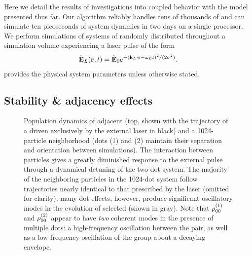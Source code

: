 Here we detail the results of investigations into coupled \qd{} behavior with the model presented thus far.
Our algorithm reliably handles tens of thousands of \qds{} and can simulate ten picoseconds of system dynamics in two days on a single processor.
We perform simulations of systems of \qds{} randomly distributed throughout a simulation volume experiencing a laser pulse of the form
\begin{equation}
  \tilde{\mathbf{E}}_L(\vb{r}, t) = \tilde{\mathbf{E}}_0 e^{-(\vb{k}_L \cdot \vb{r} - \omega_L t)^2/(2\sigma^2)}.
  \label{eq:pulse envelope}
\end{equation}
 provides the physical system parameters unless otherwise stated.

\subsection{Stability \& adjacency effects}

\begin{figure}
  \centering
  
  \caption{\label{fig:density stats}Population dynamics of adjacent \qds{} (top, shown with the trajectory of a \qd{} driven exclusively by the external laser in black) and a 1024-particle neighborhood (dots (1) and (2) maintain their separation and orientation between simulations).
    The interaction between particles gives a greatly diminished response to the external pulse through a dynamical detuning of the two-dot system.
    The majority of the neighboring particles in the 1024-dot system follow trajectories nearly identical to that prescribed by the laser (omitted for clarity); many-dot effects, however, produce significant oscillatory modes in the evolution of selected \qds{} (shown in gray).
    Note that $\rho_{00}^{\qty(1)}$ and $\rho_{00}^{\qty(2)}$ appear to have \emph{two} coherent modes in the presence of multiple dots: a high-frequency oscillation between the pair, as well as a low-frequency oscillation of the group about a decaying envelope.
}
\end{figure}

